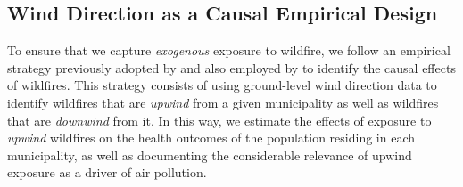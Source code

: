 \documentclass[11pt]{article}
\begin{document}
\begin{spacing}{1.3}
\subsection{Wind Direction as a Causal Empirical Design}
\label{sscn:design}
To ensure that we capture \emph{exogenous} exposure to wildfire, we follow an empirical strategy previously adopted by \cite{RangelVogl2019} and also employed by \cite{zivin2020unintended} to identify the causal effects of wildfires. This strategy consists of using ground-level wind direction data to identify wildfires that are \textit{upwind} from a given municipality as well as wildfires that are \textit{downwind} from it. In this way, we estimate the effects of exposure to \textit{upwind} wildfires on the health outcomes of the population residing in each municipality, as well as documenting the considerable relevance of upwind exposure as a driver of air pollution.  







\end{spacing}
\end{document}

